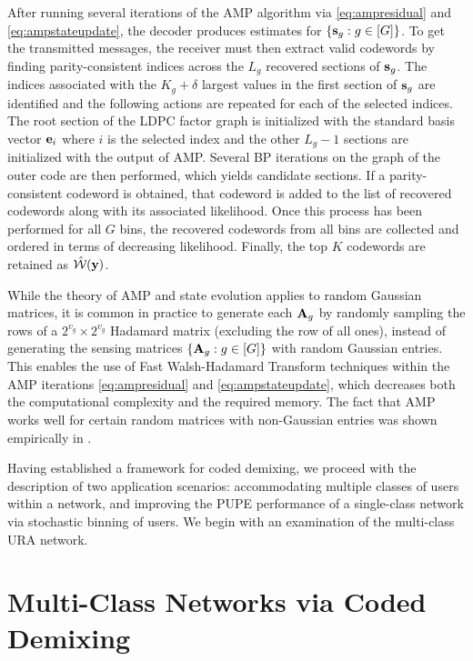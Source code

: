 \documentclass[journal]{IEEEtran}
\begin{document}
After running several iterations of the AMP algorithm via \eqref{eq:ampresidual} and \eqref{eq:ampstateupdate}, the decoder produces estimates for $\{\mathbf{s}_g : g\in [G]\}$.
To get the transmitted messages, the receiver must then extract valid codewords by finding parity-consistent indices across the $L_g$ recovered sections of $\mathbf{s}_g$.
The indices associated with the $K_g + \delta$ largest values in the first section of $\mathbf{s}_g$ are identified and the following actions are repeated for each of the selected indices. 
The root section of the LDPC factor graph is initialized with the standard basis vector $\mathbf{e}_i$ where $i$ is the selected index and the other $L_g - 1$ sections are initialized with the output of AMP.
Several BP iterations on the graph of the outer code are then performed, which yields candidate sections.
If a parity-consistent codeword is obtained, that codeword is added to the list of recovered codewords along with its associated likelihood. 
Once this process has been performed for all $G$ bins, the recovered codewords from all bins are collected and ordered in terms of decreasing likelihood.
Finally, the top $K$ codewords are retained as $\hat{\mathcal{W}}(\mathbf{y})$. 

\begin{remark}
\label{remark:hadamardmatrices}
While the theory of AMP and state evolution applies to random Gaussian matrices,
it is common in practice to generate each $\mathbf{A}_g$ by randomly sampling the rows of a $2^{v_g} \times 2^{v_g}$ Hadamard matrix (excluding the row of all ones), instead of generating the sensing matrices $\{\mathbf{A}_g : g \in [G]\}$ with random Gaussian entries.
This enables the use of Fast Walsh-Hadamard Transform techniques within the AMP iterations \eqref{eq:ampresidual} and \eqref{eq:ampstateupdate}, which decreases both the computational complexity and the required memory.
The fact that AMP works well for certain random matrices with non-Gaussian entries was shown empirically in \cite{donoho2009message}.
\end{remark}

Having established a framework for coded demixing, we proceed with the description of two application scenarios: accommodating multiple classes of users within a network, and improving the PUPE performance of a single-class network via stochastic binning of users.  
We begin with an examination of the multi-class URA network. 

\section{Multi-Class Networks via Coded Demixing}
\label{section:MulticlassviaCodedDemixing}
\end{document}
